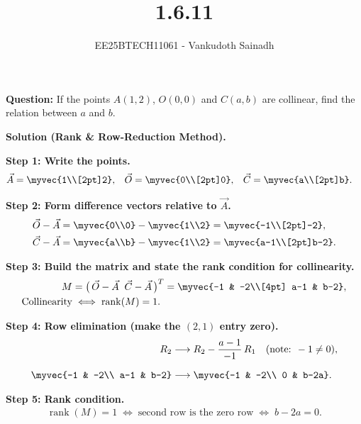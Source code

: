 \documentclass[journal,12pt,onecolumn]{IEEEtran}
\theoremstyle{remark}
\begin{document}
\title{1.6.11}
\author{EE25BTECH11061 - Vankudoth Sainadh}
\maketitle
\renewcommand{\thefigure}{\theenumi}
\renewcommand{\thetable}{\theenumi}

\textbf{Question:} If the points $A(1,2)$, $O(0,0)$ and $C(a,b)$ are collinear, find the relation between $a$ and $b$.

\medskip
\textbf{Solution (Rank \& Row-Reduction Method).}

\textbf{Step 1: Write the points.}
\begin{align*}
\vec{A} &= \myvec{1\\[2pt]2}, &
\vec{O} &= \myvec{0\\[2pt]0}, &
\vec{C} &= \myvec{a\\[2pt]b}.
\end{align*}

\textbf{Step 2: Form difference vectors relative to $\vec{A}$.}
\begin{align*}
\vec{O}-\vec{A} &= \myvec{0\\0} - \myvec{1\\2} = \myvec{-1\\[2pt]-2},\\
\vec{C}-\vec{A} &= \myvec{a\\b} - \myvec{1\\2} = \myvec{a-1\\[2pt]b-2}.
\end{align*}

\textbf{Step 3: Build the matrix and state the rank condition for collinearity.}
\begin{align*}
M &= \big(\,\vec{O}-\vec{A}\;\; \vec{C}-\vec{A}\,\big)^{T}
   = \myvec{-1 & -2\\[4pt] a-1 & b-2},\\
\text{Collinearity} &\iff \operatorname{rank}(M)=1.
\end{align*}

\textbf{Step 4: Row elimination (make the $(2,1)$ entry zero).}
\begin{align*}
R_2 &\longrightarrow R_2 - \frac{a-1}{-1}\,R_1
\quad (\text{note: }-1\neq 0),\\[6pt]
\myvec{-1 & -2\\ a-1 & b-2}
&\longrightarrow
\myvec{-1 & -2\\ 0  & b-2a}.
\end{align*}

\textbf{Step 5: Rank condition.}
\begin{align*}
\operatorname{rank}(M)=1
\;\Longleftrightarrow\;
\text{second row is the zero row}
\;\Longleftrightarrow\;
b-2a=0.
\end{align*}
\end{document}
